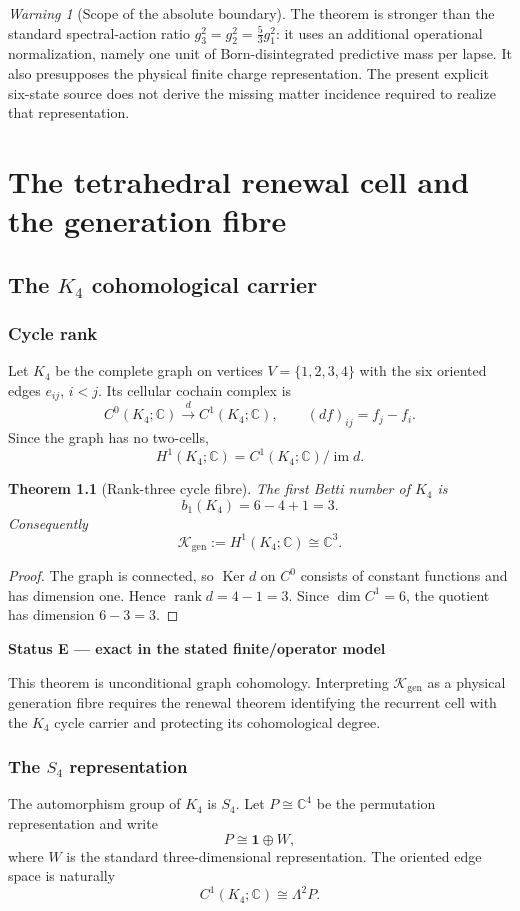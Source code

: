 \documentclass[11pt,oneside,openany]{book}
\numberwithin{equation}{chapter}
\newtheorem{theorem}{Theorem}[chapter]
\theoremstyle{definition}
\theoremstyle{remark}
\newtheorem{warning}[theorem]{Warning}
\newcommand{\C}{\mathbb C}
\newcommand{\rank}{\operatorname{rank}}
\newcommand{\im}{\operatorname{im}}
\newcommand{\Ker}{\operatorname{Ker}}
\newcommand{\Kgen}{\mathcal K_{\mathrm{gen}}}
\newenvironment{statusbox}[2]{%
  \par\medskip\noindent
  \begin{center}\begin{minipage}{0.94\textwidth}
  \colorbox{#1!8}{\parbox{\dimexpr\linewidth-2\fboxsep\relax}{\textbf{#2}}}\par\smallskip
}{%
  \end{minipage}\end{center}\medskip
}
\newcommand{\Exact}[1]{\begin{statusbox}{ExactColor}{Status E --- exact in the stated finite/operator model}#1\end{statusbox}}
\begin{document}
\begin{warning}[Scope of the absolute boundary]
The theorem is stronger than the standard spectral-action ratio
\(g_3^2=g_2^2=\frac53g_1^2\): it uses an additional operational
normalization, namely one unit of Born-disintegrated predictive mass per
lapse.  It also presupposes the physical finite charge representation.  The
present explicit six-state source does not derive the missing matter
incidence required to realize that representation.
\end{warning}


\part{The tetrahedral renewal cell and the generation fibre}

\chapter{The \texorpdfstring{$K_4$}{K4} cohomological carrier}
\label{ch:k4}

\section{Cycle rank}
Let $K_4$ be the complete graph on vertices $V=\{1,2,3,4\}$ with the six oriented edges $e_{ij}$, $i<j$.  Its cellular cochain complex is
\[
 C^0(K_4;\C)\xrightarrow{\,d\,}C^1(K_4;\C),
 \qquad
 (df)_{ij}=f_j-f_i.
\]
Since the graph has no two-cells,
\[
 H^1(K_4;\C)=C^1(K_4;\C)/\im d.
\]

\begin{theorem}[Rank-three cycle fibre]
\label{thm:b1-three}
The first Betti number of $K_4$ is
\[
 \boxed{b_1(K_4)=6-4+1=3.}
\]
Consequently
\[
 \boxed{\Kgen:=H^1(K_4;\C)\cong\C^3.}
\]
\end{theorem}

\begin{proof}
The graph is connected, so $\Ker d$ on $C^0$ consists of constant functions and has dimension one.  Hence $\rank d=4-1=3$.  Since $\dim C^1=6$, the quotient has dimension $6-3=3$.
\end{proof}

\Exact{This theorem is unconditional graph cohomology.  Interpreting $\Kgen$ as a physical generation fibre requires the renewal theorem identifying the recurrent cell with the $K_4$ cycle carrier and protecting its cohomological degree.}

\section{The \texorpdfstring{$S_4$}{S4} representation}
The automorphism group of $K_4$ is $S_4$.  Let $P\cong\C^4$ be the permutation representation and write
\[
 P\cong\mathbf1\oplus W,
\]
where $W$ is the standard three-dimensional representation.  The oriented edge space is naturally
\[
 C^1(K_4;\C)\cong\Lambda^2P.
\]
\end{document}
